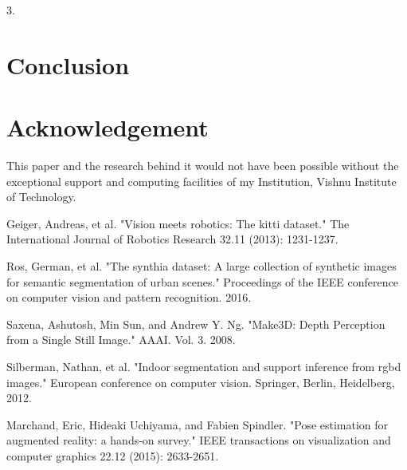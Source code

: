 \documentclass{article}
\begin{document}
3. 
\section{Conclusion}
\section{Acknowledgement}
This paper and the research behind it would not have been possible without the exceptional support and computing facilities of my Institution, Vishnu Institute of Technology.
\begin{thebibliography}{10}
 Geiger, Andreas, et al. "Vision meets robotics: The kitti dataset." The International Journal of Robotics Research 32.11 (2013): 1231-1237.

 Ros, German, et al. "The synthia dataset: A large collection of synthetic images for semantic segmentation of urban scenes." Proceedings of the IEEE conference on computer vision and pattern recognition. 2016.

 Saxena, Ashutosh, Min Sun, and Andrew Y. Ng. "Make3D: Depth Perception from a Single Still Image." AAAI. Vol. 3. 2008.

 Silberman, Nathan, et al. "Indoor segmentation and support inference from rgbd images." European conference on computer vision. Springer, Berlin, Heidelberg, 2012.

 Marchand, Eric, Hideaki Uchiyama, and Fabien Spindler. "Pose estimation for augmented reality: a hands-on survey." IEEE transactions on visualization and computer graphics 22.12 (2015): 2633-2651.

\end{thebibliography}
\end{document}
